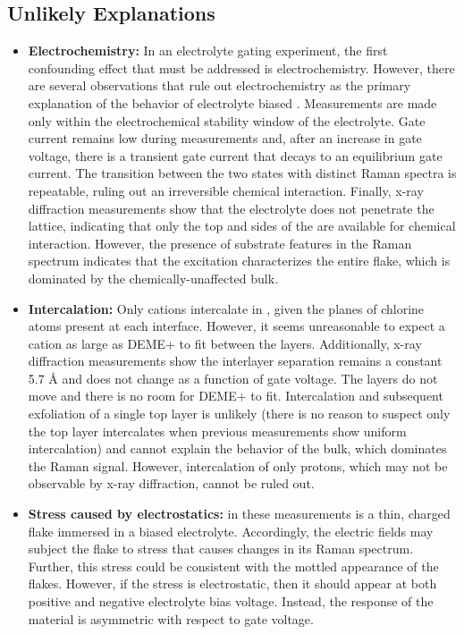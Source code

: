 \subsection{Unlikely Explanations}
\begin{itemize}
\item \textbf{Electrochemistry:} In an electrolyte gating experiment, the first confounding effect that must be addressed is electrochemistry. However, there are several observations that rule out electrochemistry as the primary explanation of the behavior of electrolyte biased \ruclnospace . Measurements are made only within the electrochemical stability window of the electrolyte. Gate current remains low during measurements and, after an increase in gate voltage, there is a transient gate current that decays to an equilibrium gate current. The transition between the two states with distinct Raman spectra is repeatable, ruling out an irreversible chemical interaction. Finally, x-ray diffraction measurements show that the electrolyte does not penetrate the \rucl lattice, indicating that only the top and sides of the \rucl are available for chemical interaction. However, the presence of substrate features in the Raman spectrum indicates that the excitation characterizes the entire flake, which is dominated by the chemically-unaffected bulk.

\item \textbf{Intercalation:} Only cations intercalate in \ruclnospace , given the planes of chlorine atoms present at each interface. However, it seems unreasonable to expect a cation as large as DEME+ to fit between the layers. Additionally, x-ray diffraction measurements show the interlayer separation remains a constant 5.7 \AA{} and does not change as a function of gate voltage. The layers do not move and there is no room for DEME+ to fit. Intercalation and subsequent exfoliation of a single top layer is unlikely (there is no reason to suspect only the top layer intercalates when previous measurements show uniform intercalation) and cannot explain the behavior of the bulk, which dominates the Raman signal. However, intercalation of only protons, which may not be observable by x-ray diffraction, cannot be ruled out.

\item \textbf{Stress caused by electrostatics:} \rucl in these measurements is a thin, charged flake immersed in a biased electrolyte. Accordingly, the electric fields may subject the flake to stress that causes changes in its Raman spectrum. Further, this stress could be consistent with the mottled appearance of the flakes. However, if the stress is electrostatic, then it should appear at both positive and negative electrolyte bias voltage. Instead, the response of the material is asymmetric with respect to gate voltage.


\end{itemize}
